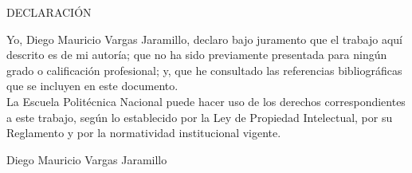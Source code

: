 \pagestyle{empty}
\vspace*{30mm}
\begin{center}
	DECLARACIÓN
\end{center}

Yo, Diego Mauricio Vargas Jaramillo, declaro bajo juramento que el trabajo aquí descrito es de mi autoría; que no ha sido previamente presentada para ningún grado o calificación profesional; y, que he consultado las referencias bibliográficas que se incluyen en este documento.\\

La Escuela Politécnica Nacional puede hacer uso de los derechos correspondientes a este trabajo, según lo establecido por la Ley de Propiedad Intelectual, por su Reglamento y por la normatividad institucional vigente.\vspace{30mm}

\begin{center}
	
	Diego Mauricio Vargas Jaramillo
\end{center}